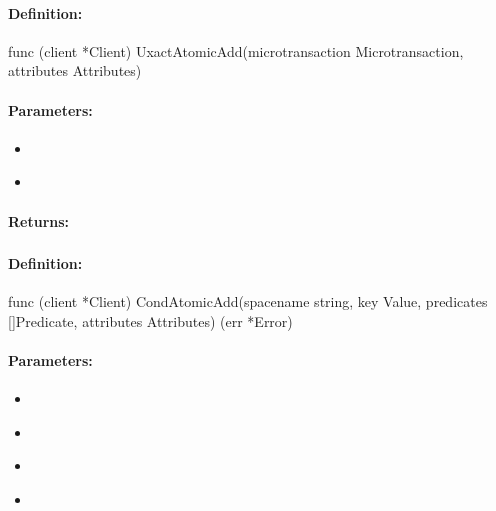 \paragraph{Definition:}
\begin{gocode}
func (client *Client) UxactAtomicAdd(microtransaction Microtransaction, attributes Attributes)
\end{gocode}

\paragraph{Parameters:}
\begin{itemize}[noitemsep]
\item {}\\

\item {}\\

\end{itemize}

\paragraph{Returns:}


\pagebreak
\subsubsection{}
\label{api:Go:CondAtomicAdd}


\paragraph{Definition:}
\begin{gocode}
func (client *Client) CondAtomicAdd(spacename string, key Value, predicates []Predicate, attributes Attributes) (err *Error)
\end{gocode}

\paragraph{Parameters:}
\begin{itemize}[noitemsep]
\item {}\\

\item {}\\

\item {}\\

\item {}\\

\end{itemize}

